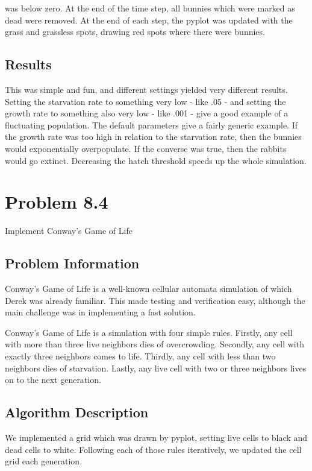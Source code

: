 was below zero.  At the end of the time step, all bunnies which were marked as dead were removed.  At the end of each step, the pyplot was updated with the grass and grassless spots, drawing red spots where there were bunnies.

\subsection{Results}

This was simple and fun, and different settings yielded very different results.  Setting the starvation rate to something very low - like .05 - and setting the growth rate to something also very low - like .001 - give a good example of a fluctuating population.  The default parameters give a fairly generic example.  If the growth rate was too high in relation to the starvation rate, then the bunnies would exponentially overpopulate.  If the converse was
 true, then the rabbits would go extinct.  Decreasing the hatch threshold speeds up the whole simulation.
  




\section{Problem 8.4}

Implement Conway's Game of Life

\subsection{Problem Information}

Conway's Game of Life is a well-known cellular automata simulation of which Derek was already familiar.  This made testing and verification easy, although the main challenge was in implementing a fast solution.  

Conway's Game of Life is a simulation with four simple rules.  Firstly, any cell with more than three live neighbors dies of overcrowding.  Secondly, any cell with exactly three neighbors comes to life.  Thirdly, any cell with less than two neighbors dies of starvation.  Lastly, any live cell with two or three neighbors lives on to the next generation.

\subsection{Algorithm Description}

We implemented a grid which was drawn by pyplot, setting live cells to black and dead cells to white.  Following each of those rules iteratively, we updated the cell grid each generation.  

